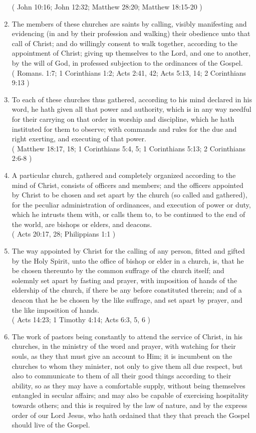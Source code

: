\documentclass[12pt,a4paper]{book}
\begin{document}
\begin{enumerate}
( John 10:16; John 12:32; Matthew 28:20; Matthew 18:15-20 )
\item
\label{ch-chu-6}
The members of these churches are saints by calling, visibly manifesting and evidencing (in and by their profession and walking) their obedience unto that call of Christ; and do willingly consent to walk together, according to the appointment of Christ; giving up themselves to the Lord, and one to another, by the will of God, in professed subjection to the ordinances of the Gospel.\\
( Romans. 1:7; 1 Corinthians 1:2; Acts 2:41, 42; Acts 5:13, 14; 2 Corinthians 9:13 )
\item
\label{ch-chu-7}
To each of these churches thus gathered, according to his mind declared in his word, he hath given all that power and authority, which is in any way needful for their carrying on that order in worship and discipline, which he hath instituted for them to observe; with commands and rules for the due and right exerting, and executing of that power.\\
( Matthew 18:17, 18; 1 Corinthians 5:4, 5; 1 Corinthians 5:13; 2 Corinthians 2:6-8 )
\item
\label{ch-chu-8}
A particular church, gathered and completely organized according to the mind of Christ, consists of officers and members; and the officers appointed by Christ to be chosen and set apart by the church (so called and gathered), for the peculiar administration of ordinances, and execution of power or duty, which he intrusts them with, or calls them to, to be continued to the end of the world, are bishops or elders, and deacons.\\
( Acts 20:17, 28; Philippians 1:1 )
\item
\label{ch-chu-9}
The way appointed by Christ for the calling of any person, fitted and gifted by the Holy Spirit, unto the office of bishop or elder in a church, is, that he be chosen thereunto by the common suffrage of the church itself; and solemnly set apart by fasting and prayer, with imposition of hands of the eldership of the church, if there be any before constituted therein; and of a deacon that he be chosen by the like suffrage, and set apart by prayer, and the like imposition of hands.\\
( Acts 14:23; 1 Timothy 4:14; Acts 6:3, 5, 6 )
\item
\label{ch-chu-10}
The work of pastors being constantly to attend the service of Christ, in his churches, in the ministry of the word and prayer, with watching for their souls, as they that must give an account to Him; it is incumbent on the churches to whom they minister, not only to give them all due respect, but also to communicate to them of all their good things according to their ability, so as they may have a comfortable supply, without being themselves entangled in secular affairs; and may also be capable of exercising hospitality towards others; and this is required by the law of nature, and by the express order of our Lord Jesus, who hath ordained that they that preach the Gospel should live of the Gospel.\\

\end{enumerate}
\end{document}
